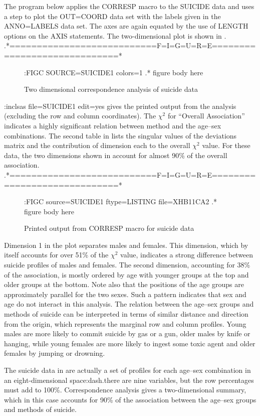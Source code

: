 The program below applies the CORRESP macro to the SUICIDE data
and uses a  step to
plot the OUT=COORD data set with the labels given in the ANNO=LABELS
data set.
The axes are again equated by the use of LENGTH options on the
AXIS statements.
The two-dimensional plot is shown in .
.*===========================F=I=G=U=R=E=============================*
\begin{figure}\label{ca1}
:FIGC SOURCE=SUICIDE1 colors=1
.* figure body here
\caption{Two dimensional correspondence analysis of suicide data}
\end{figure}
:inclsas file=SUICIDE1 edit=yes
 gives the printed output from the analysis
(excluding the row and column coordinates).
The \(\chi^2\) for
``Overall Association'' indicates a highly significant
relation between method and the age--sex combinations.
The second table in  lists the singular values of
the deviations matrix
and the contribution of dimension
each to the overall \(\chi^2\) value.
For these data, the two dimensions shown in 
account for almost 90\% of the overall association.
.*===========================F=I=G=U=R=E=============================*
\begin{figure}\label{ca2}
:FIGC source=SUICIDE1 ftype=LISTING file=XHB11CA2
.* figure body here

\caption{Printed output from CORRESP macro for suicide data}
\end{figure}

Dimension 1 in the plot separates males and females.  This dimension,
which by itself accounts for over 51\% of the \(\chi^2\) value,
indicates a strong difference between suicide profiles of males
and females.
The second
dimension, accounting for 38\% of the association,
is mostly ordered by age with younger groups at the top
and older groups at the bottom.
Note also that the positions of the age groups are approximately
parallel for the two sexes.
Such a pattern indicates that sex and age do not interact in this
analysis.
The relation between the age--sex
groups and methods of suicide can be interpreted in terms of
similar
distance and direction from the origin, which represents the marginal
row and column profiles.
Young males are more likely to commit suicide
by gas or a gun, older males by knife or hanging, while young
females are more likely to ingest some toxic agent and older females
by jumping or drowning.

The suicide data in  are actually a set of
profiles for each age--sex combination in an eight-dimensional
space:dash.there are nine variables, but the row percentages must
add to 100\%.  Correspondence analysis gives a two-dimensional summary,
which in this case accounts for 90\% of the association between the
age--sex groups and methods of suicide.

